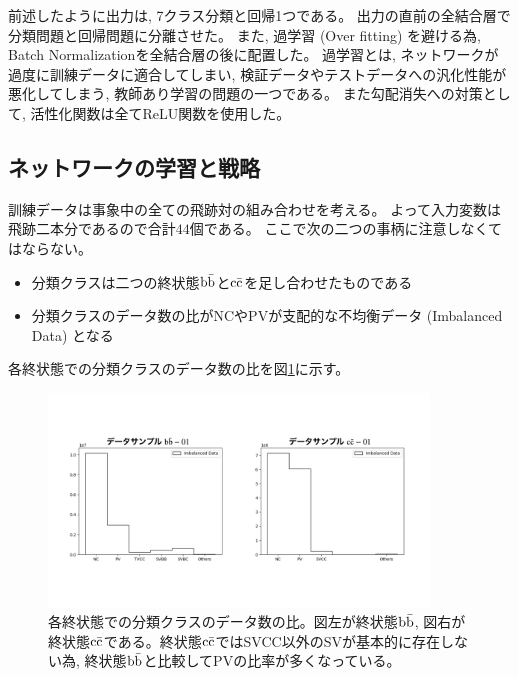 前述したように出力は, 7クラス分類と回帰1つである。
出力の直前の全結合層で分類問題と回帰問題に分離させた。
また, 過学習 (Over fitting) を避ける為, Batch Normalization\cite{BatchNormalizationpaper}を全結合層の後に配置した。
過学習とは, ネットワークが過度に訓練データに適合してしまい, 検証データやテストデータへの汎化性能が悪化してしまう, 教師あり学習の問題の一つである。
また勾配消失への対策として, 活性化関数は全てReLU関数を使用した。


\subsection{ネットワークの学習と戦略} \label{Net:PM:TrainingandStrategyofPM}

訓練データは事象中の全ての飛跡対の組み合わせを考える。
よって入力変数は飛跡二本分であるので合計$44$個である。
ここで次の二つの事柄に注意しなくてはならない。

\begin{itemize}
 \item 分類クラスは二つの終状態$\rm b\bar{b}$と$\rm c\bar{c}$を足し合わせたものである
 \item 分類クラスのデータ数の比がNCやPVが支配的な不均衡データ (Imbalanced Data) となる
\end{itemize}

各終状態での分類クラスのデータ数の比を図\ref{3-3-2-1ImbalancedData}に示す。

\begin{figure}[htbp]
 \centering
 \includegraphics[trim = 100 200 100 150, width=0.9\textwidth, clip]{Figure/3Networks/3-3-2-1ImbalancedData.png}
 \caption[各終状態での分類クラスのデータ数の比]{各終状態での分類クラスのデータ数の比。図左が終状態$\rm b\bar{b}$, 図右が終状態$\rm c\bar{c}$である。終状態$\rm c\bar{c}$ではSVCC以外のSVが基本的に存在しない為, 終状態$\rm b\bar{b}$と比較してPVの比率が多くなっている。}
 \label{3-3-2-1ImbalancedData}
\end{figure}

